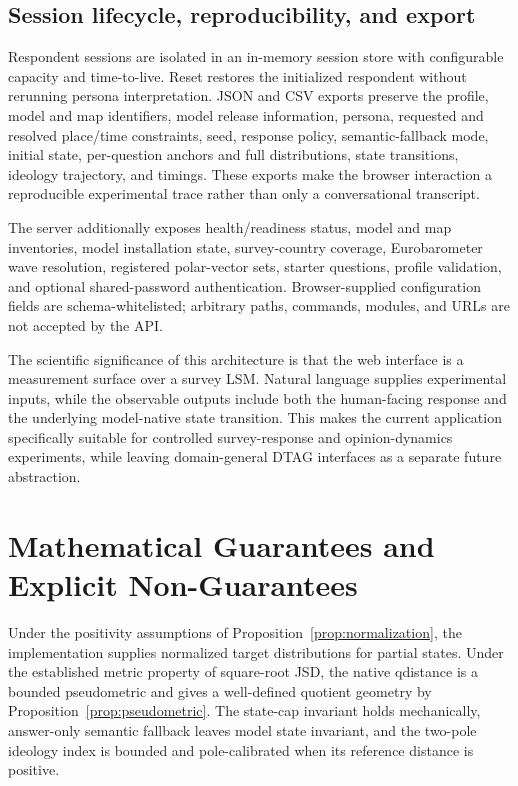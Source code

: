 \documentclass[journal]{IEEEtran}
\newcommand{\1}{\mathbf{1}}
\begin{document}
\subsection{Session lifecycle, reproducibility, and export}

Respondent sessions are isolated in an in-memory session store with configurable capacity and time-to-live. Reset restores the initialized respondent without rerunning persona interpretation. JSON and CSV exports preserve the profile, model and map identifiers, model release information, persona, requested and resolved place/time constraints, seed, response policy, semantic-fallback mode, initial state, per-question anchors and full distributions, state transitions, ideology trajectory, and timings. These exports make the browser interaction a reproducible experimental trace rather than only a conversational transcript.

The server additionally exposes health/readiness status, model and map inventories, model installation state, survey-country coverage, Eurobarometer wave resolution, registered polar-vector sets, starter questions, profile validation, and optional shared-password authentication. Browser-supplied configuration fields are schema-whitelisted; arbitrary paths, commands, modules, and URLs are not accepted by the API.

The scientific significance of this architecture is that the web interface is a measurement surface over a survey LSM. Natural language supplies experimental inputs, while the observable outputs include both the human-facing response and the underlying model-native state transition. This makes the current application specifically suitable for controlled survey-response and opinion-dynamics experiments, while leaving domain-general DTAG interfaces as a separate future abstraction.

\section{Mathematical Guarantees and Explicit Non-Guarantees}
\label{sec:guarantees}

Under the positivity assumptions of Proposition~\ref{prop:normalization}, the implementation supplies normalized target distributions for partial states. Under the established metric property of square-root JSD, the native qdistance is a bounded pseudometric and gives a well-defined quotient geometry by Proposition~\ref{prop:pseudometric}. The state-cap invariant holds mechanically, answer-only semantic fallback leaves model state invariant, and the two-pole ideology index is bounded and pole-calibrated when its reference distance is positive.
\end{document}
